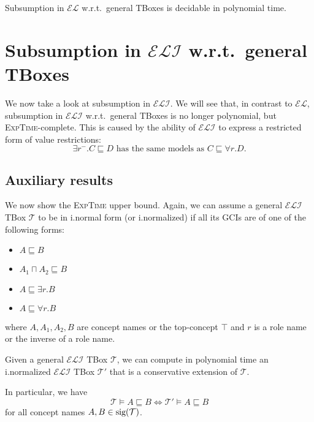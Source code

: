 \begin{theorem}
		Subsumption in $\mathcal{EL}$ w.r.t.\ general TBoxes is decidable in polynomial time.
\end{theorem}

\newpage
\section{Subsumption in $\mathcal{ELI}$ w.r.t.\ general TBoxes}
We now take a look at subsumption in $\mathcal{ELI}$.
We will see that, in contrast to $\mathcal{EL}$, subsumption in $\mathcal{ELI}$ w.r.t.\ general TBoxes
is no longer polynomial, but \textsc{ExpTime}-complete.
This is caused by the ability of $\mathcal{ELI}$ to express a restricted form of value restrictions:
\[
\exists r^-.C \sqsubseteq D \text{ has the same models as } C \sqsubseteq \forall r.D
.\]

\subsection{Auxiliary results}
We now show the \textsc{ExpTime} upper bound.
Again, we can assume a general $\mathcal{ELI}$ TBox $\mathcal{T}$ to be in i.normal form (or i.normalized)
if all its GCIs are of one of the following forms:
\begin{itemize}
	\item $A \sqsubseteq B$
	\item $A_1 \sqcap A_2 \sqsubseteq B$
	\item $A \sqsubseteq \exists r.B$
	\item $A \sqsubseteq \forall r.B$
\end{itemize}
where $A, A_1, A_2, B$ are concept names or the top-concept $\top$
and $r$ is a role name or the inverse of a role name.

\begin{corollary}
	Given a general $\mathcal{ELI}$ TBox $\mathcal{T}$, we can compute in polynomial time
	an i.normalized $\mathcal{ELI}$ TBox $\mathcal{T}'$ that is a conservative extension of $\mathcal{T}$.
	
	In particular, we have
	\[
	\mathcal{T} \vDash A \sqsubseteq B \iff \mathcal{T}' \vDash A \sqsubseteq B
	\]
	for all concept names $A, B \in \operatorname{\text{sig}}(\mathcal{T})$.
\end{corollary}

